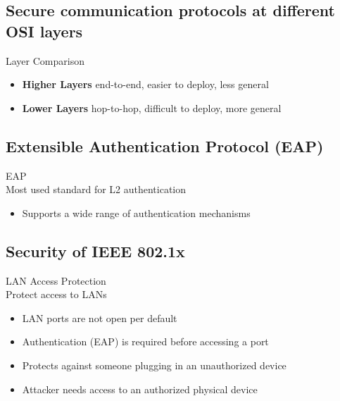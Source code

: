 \subsection{Secure communication protocols at different OSI layers}

\begin{concept}{Layer Comparison}\\
    \begin{itemize}
        \item \textbf{Higher Layers} end-to-end, easier to deploy, less general
        \item \textbf{Lower Layers} hop-to-hop, difficult to deploy, more general
    \end{itemize}
\end{concept}


\subsection{Extensible Authentication Protocol (EAP)}

\begin{definition}{EAP}\\
    Most used standard for L2 authentication
    \begin{itemize}
        \item Supports a wide range of authentication mechanisms
    \end{itemize}
\end{definition}

\subsection{Security of IEEE 802.1x}

\begin{concept}{LAN Access Protection}\\
    Protect access to LANs
    \begin{itemize}
        \item LAN ports are not open per default
        \item Authentication (EAP) is required before accessing a port
        \item Protects against someone plugging in an unauthorized device
        \item Attacker needs access to an authorized physical device
    \end{itemize}
\end{concept}

